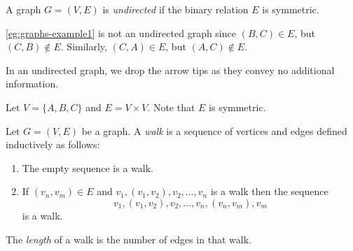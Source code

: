 \documentclass{amsart}
\begin{document}
\begin{defn}
  \label{defn:graphs-undirected}
  A graph $G = (V,E)$ is \emph{undirected} if the binary relation $E$ is symmetric.
\end{defn}

\para
\cref{eg:graphs-example1} is not an undirected graph since $(B,C) \in E$, but $(C,B) \notin E$.
Similarly, $(C,A) \in E$, but $(A,C) \notin E$.

\para
In an undirected graph, we drop the arrow tips as they convey no additional information.

\begin{eg}
  \label{eg:graphs-example2}
  Let $V = \{A, B, C\}$ and $E = V \times V$.
  Note that $E$ is symmetric.
  \begin{center}
  \end{center}
\end{eg}

\begin{defn}
  \label{defn:walks}
  Let $G = (V,E)$ be a graph.
  A \emph{walk} is a sequence of vertices and edges defined inductively as follows:
  \begin{enumerate}
  \item The empty sequence is a walk.
  \item If $(v_{n}, v_{m}) \in E$ and $v_{1},(v_{1},v_{2}),v_{2},\ldots,v_{n}$ is a walk then the sequence
    \[
      v_{1},(v_{1},v_{2}),v_{2},\ldots,v_{n},(v_{n},v_{m}),v_{m}
    \]
    is a walk.
  \end{enumerate}
\end{defn}

\begin{defn}
  \label{defn:walks-length}
  The \emph{length} of a walk is the number of edges in that walk.
\end{defn}
\end{document}
